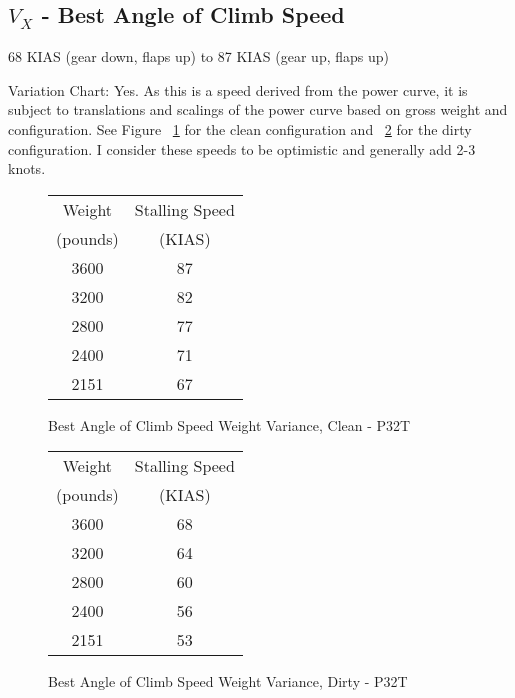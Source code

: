 \subsection{$V_X$ - Best Angle of Climb Speed}

68 KIAS (gear down, flaps up) to 87 KIAS (gear up, flaps up)

Variation Chart: Yes. As this is a speed derived from the power curve, it is subject to translations and scalings of the power curve based on gross weight and configuration. See Figure ~\ref{fig:VXCleanP32T} for the clean configuration and ~\ref{fig:VXDirtyP32T} for the dirty configuration. I consider these speeds to be optimistic and generally add 2-3 knots.

\begin{figure}
\begin{center}
\begin{tabular}{ |c|c| }
    \hline
    Weight & Stalling Speed \\
    (pounds) & (KIAS) \\
    \hline
     3600 &  87 \\
     3200 &  82 \\
    \hline
     2800 &  77 \\
     2400 &  71 \\
    \hline
     2151 &  67 \\
    \hline
\end{tabular}
\end{center}
\caption{Best Angle of Climb Speed Weight Variance, Clean - P32T}
\label{fig:VXCleanP32T}
\end{figure}

\begin{figure}
\begin{center}
\begin{tabular}{ |c|c| }
    \hline
    Weight & Stalling Speed \\
    (pounds) & (KIAS) \\
    \hline
     3600 &  68 \\
     3200 &  64 \\
    \hline
     2800 &  60 \\
     2400 &  56 \\
    \hline
     2151 &  53 \\
    \hline
\end{tabular}
\end{center}
\caption{Best Angle of Climb Speed Weight Variance, Dirty - P32T}
\label{fig:VXDirtyP32T}
\end{figure}

